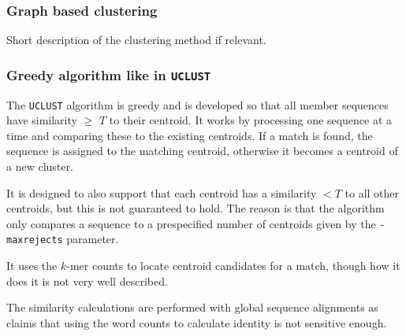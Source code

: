 \subsubsection{Graph based clustering}
Short description of the clustering method if relevant.


\subsubsection{Greedy algorithm like in \texttt{UCLUST}}
The \texttt{UCLUST} algorithm is greedy and is developed so that all member
sequences have similarity $\geq$ $T$ to their centroid.  It works by processing
one sequence at a time and comparing these to the existing centroids. If a
match is found, the sequence is assigned to the matching centroid, otherwise it
becomes a centroid of a new cluster.

It is designed to also support that each centroid has a similarity $<T$ to all
other centroids, but this is not guaranteed to hold. The reason is that the
algorithm only compares a sequence to a prespecified number of centroids given
by the \texttt{-maxrejects} parameter.

It uses the $k$-mer counts to locate centroid candidates for a match, though
how it does it is not very well described.

The similarity calculations are performed with global sequence alignments as
\cite{usearch} claims that using the word counts to calculate identity is not
sensitive enough.


